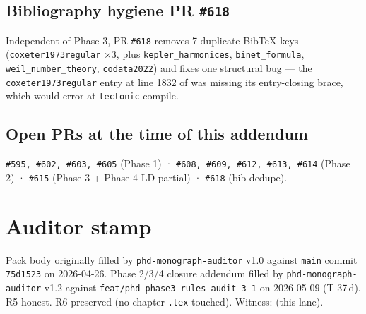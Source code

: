 \subsection*{Bibliography hygiene PR \texttt{\#618}}

Independent of Phase 3, PR \texttt{\#618} removes 7 duplicate BibTeX
keys (\texttt{coxeter1973regular} ×3, plus \texttt{kepler\_harmonices},
\texttt{binet\_formula}, \texttt{weil\_number\_theory},
\texttt{codata2022}) and fixes one structural bug — the
\texttt{coxeter1973regular} entry at line 1832 of
 was missing its entry-closing
brace, which would error at \texttt{tectonic} compile.

\subsection*{Open PRs at the time of this addendum}

\texttt{\#595, \#602, \#603, \#605} (Phase 1) ·
\texttt{\#608, \#609, \#612, \#613, \#614} (Phase 2) ·
\texttt{\#615} (Phase 3 + Phase 4 LD partial) ·
\texttt{\#618} (bib dedupe).

\section{Auditor stamp}

Pack body originally filled by \texttt{phd-monograph-auditor} v1.0
against \texttt{main} commit \texttt{75d1523} on 2026-04-26. Phase 2/3/4
closure addendum filled by \texttt{phd-monograph-auditor} v1.2 against
\texttt{feat/phd-phase3-rules-audit-3-1} on 2026-05-09 (T-37\,d).
R5 honest. R6 preserved (no chapter \texttt{.tex} touched). Witness:
 (this lane).
